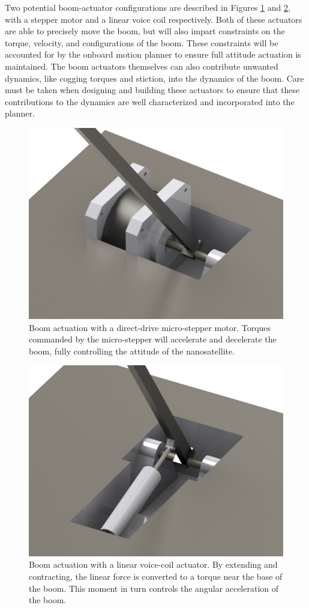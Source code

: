 Two potential boom-actuator configurations are described in Figures \ref{fig:stepper} and \ref{fig:voice}, with a stepper motor and a linear voice coil respectively. Both of these actuators are able to precisely move the boom, but will also impart constraints on the torque, velocity, and configurations of the boom. These constraints will be accounted for by the onboard motion planner to ensure full attitude actuation is maintained. The boom actuators themselves can also contribute unwanted dynamics, like cogging torques and stiction, into the dynamics of the boom. Care must be taken when designing and building these actuators to ensure that these contributions to the dynamics are well characterized and incorporated into the planner. 
\begin{figure}
    \centering
    \includegraphics[width=.5\linewidth]{Figures/stepper_render.jpg}
    \caption{Boom actuation with a direct-drive micro-stepper motor. Torques commanded by the micro-stepper will accelerate and decelerate the boom, fully controlling the attitude of the nanosatellite.}
    \label{fig:stepper}
\end{figure}
\begin{figure}
    \centering
    \includegraphics[width=.5\linewidth]{Figures/voice_coil_render.jpg}
    \caption{Boom actuation with a linear voice-coil actuator. By extending and contracting, the linear force is converted to a torque near the base of the boom. This moment in turn controls the angular acceleration of the boom.}
    \label{fig:voice}
\end{figure}

